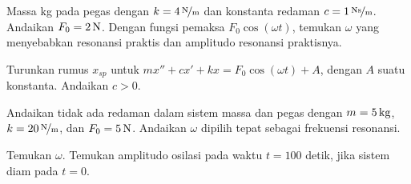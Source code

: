 \setcounter{exercise}{100}

\begin{exercise}
Massa \unit[4]{kg} pada pegas dengan $k=\unitfrac[4]{N}{m}$ dan konstanta redaman $c=\unitfrac[1]{Ns}{m}$. Andaikan $F_0 = \unit[2]{N}$. Dengan fungsi pemaksa $F_0 \cos (\omega t)$, temukan $\omega$ yang menyebabkan resonansi praktis dan amplitudo resonansi praktisnya.
\end{exercise}

\begin{exercise}
Turunkan rumus $x_{sp}$ untuk $mx''+cx'+kx = F_0 \cos(\omega t) + A$, dengan $A$ suatu konstanta. Andaikan $c > 0$.
\end{exercise}

\begin{exercise}
Andaikan tidak ada redaman dalam sistem massa dan pegas dengan $m = \unit[5]{kg}$, $k= \unitfrac[20]{N}{m}$, dan $F_0 = \unit[5]{N}$. Andaikan $\omega$ dipilih tepat sebagai frekuensi resonansi.
\begin{tasks}
\task Temukan $\omega$.
\task Temukan amplitudo osilasi pada waktu $t=100$ detik, jika sistem diam pada $t=0$.
\end{tasks}
\end{exercise}

